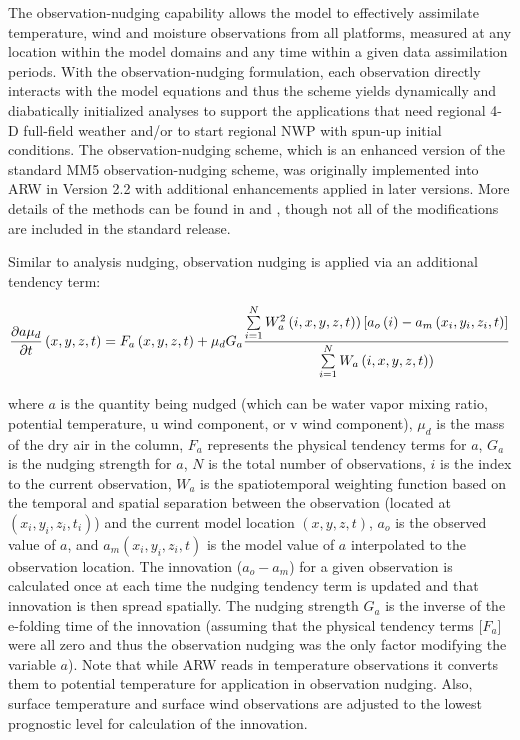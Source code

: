 The observation-nudging capability allows the model to effectively assimilate temperature, wind and moisture observations from all platforms, measured at any location within the model domains and any time within a given data assimilation periods. With the observation-nudging formulation, each observation directly interacts with the model equations and thus the scheme yields dynamically and diabatically initialized analyses to support the applications that need regional 4-D full-field weather and/or to start regional NWP with spun-up initial conditions. The observation-nudging scheme, which is an enhanced version of the standard MM5 observation-nudging scheme, was originally implemented into ARW in Version 2.2 with additional enhancements applied in later versions. More details of the methods can be found in \citet{liu08} and \citet{deng09}, though not all of the modifications are included in the standard release.

Similar to analysis nudging, observation nudging is applied via an additional tendency term:

$$ {\partial a \mu_d \over \partial t}\left( x,y,z,t \right) = F_a\left( x,y,z,t \right) + \mu_d G_a { \sum\limits_{i=1}^{N} W^2_a\left(i,x,y,z,t)\right)\left[a_o\left( i \right) - a_m\left( x_i,y_i,z_i,t\right)\right] \over \sum\limits_{i=1}^{N} W_a\left(i,x,y,z,t)\right)} $$

\noindent
where $a$ is the quantity being nudged (which can be water vapor mixing ratio, potential temperature, u wind component, or v wind component), $\mu_d$ is the mass of the dry air in the column, $F_a$ represents the physical tendency terms for $a$, $G_a$ is the nudging strength for $a$, $N$ is the total number of observations, $i$ is the index to the current observation, $W_a$ is the spatiotemporal weighting function based on the temporal and spatial separation between the observation (located at $(x_i, y_i, z_i, t_i)$) and the current model location $(x, y, z, t)$, $a_o$ is the observed value of $a$, and $a_m(x_i,y_i,z_i,t)$ is the model value of $a$ interpolated to the observation location.  The innovation ($a_o-a_m$) for a given observation is calculated once at each time the nudging tendency term is updated and that innovation is then spread spatially. The nudging strength $G_a$ is the inverse of the e-folding time of the innovation (assuming that the physical tendency terms [$F_a$] were all zero and thus the observation nudging was the only factor modifying the variable $a$).  Note that while ARW reads in temperature observations it converts them to potential temperature for application in observation nudging.  Also, surface temperature and surface wind observations are adjusted to the lowest prognostic level for calculation of the innovation.


